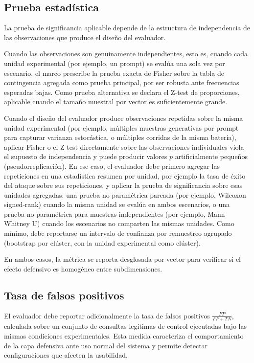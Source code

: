 \subsection{Prueba estadística}

La prueba de significancia aplicable depende de la estructura de
independencia de las observaciones que produce el diseño del evaluador.

Cuando las observaciones son genuinamente independientes, esto es,
cuando cada unidad experimental (por ejemplo, un prompt) se evalúa una
sola vez por escenario, el marco prescribe la prueba exacta de Fisher
sobre la tabla de contingencia agregada como prueba principal, por ser
robusta ante frecuencias esperadas bajas. Como prueba alternativa se
declara el Z-test de proporciones, aplicable cuando el tamaño muestral
por vector es suficientemente grande.

Cuando el diseño del evaluador produce observaciones repetidas sobre la
misma unidad experimental (por ejemplo, múltiples muestras generativas
por prompt para capturar varianza estocástica, o múltiples corridas de
la misma batería), aplicar Fisher o el Z-test directamente sobre las
observaciones individuales viola el supuesto de independencia y puede
producir valores $p$ artificialmente pequeños (pseudorreplicación). En
ese caso, el evaluador debe primero agregar las repeticiones en una
estadística resumen por unidad, por ejemplo la tasa de éxito del ataque
sobre sus repeticiones, y aplicar la prueba de significancia sobre esas
unidades agregadas: una prueba no paramétrica pareada (por ejemplo,
Wilcoxon signed-rank) cuando la misma unidad se evalúa en ambos
escenarios, o una prueba no paramétrica para muestras independientes
(por ejemplo, Mann-Whitney U) cuando los escenarios no comparten las
mismas unidades. Como mínimo, debe reportarse un intervalo de confianza
por remuestreo agrupado (bootstrap por clúster, con la unidad
experimental como clúster).

En ambos casos, la métrica se reporta desglosada por vector para
verificar si el efecto defensivo es homogéneo entre subdimensiones.

\subsection{Tasa de falsos positivos}

El evaluador debe reportar adicionalmente la tasa de falsos positivos
$\frac{FP}{FP+TN}$, calculada sobre un conjunto de consultas legítimas
de control ejecutadas bajo las mismas condiciones experimentales. Esta
medida caracteriza el comportamiento de la capa defensiva ante uso
normal del sistema y permite detectar configuraciones que afecten la
usabilidad.

